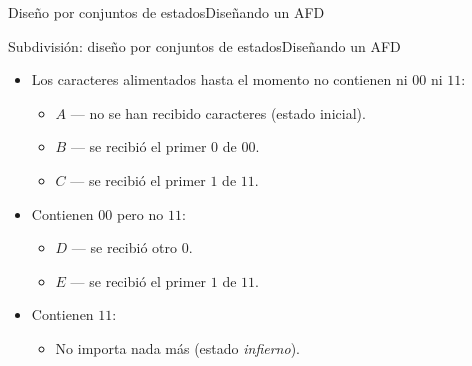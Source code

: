\documentclass[spanish, handout]{beamer}
\begin{document}
\begin{frame}{Diseño por conjuntos de estados}{Diseñando un AFD}
    \begin{center}
    \end{center}
\end{frame}

\begin{frame}{Subdivisión: diseño por conjuntos de estados}{Diseñando un AFD}
    \begin{itemize}
        \itemsep1.5ex
        \item Los caracteres alimentados hasta el momento no contienen ni $00$ ni $11$: \pause
        \begin{itemize}
            \item $A$ --- no se han recibido caracteres (estado inicial). \pause
            \item $B$ --- se recibió el primer $0$ de $00$. \pause
            \item $C$ --- se recibió el primer $1$ de $11$. \pause
        \end{itemize}
        \item Contienen $00$ pero no $11$: \pause
        \begin{itemize}
            \item $D$ --- se recibió otro $0$. \pause
            \item $E$ --- se recibió el primer $1$ de $11$. \pause
        \end{itemize}
        \item Contienen $11$: \pause
            \begin{itemize}
                \item No importa nada más (estado \textit{infierno}).
            \end{itemize}
    \end{itemize}
\end{frame}
\end{document}
